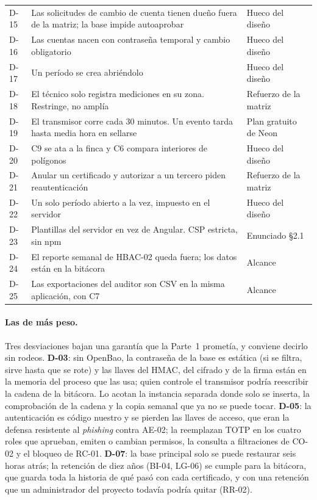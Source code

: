 \documentclass[11pt,a4paper]{article}
\theoremstyle{definition}
\theoremstyle{remark}
\begin{document}
{\begin{xltabular}{\linewidth}{@{}P{0.9cm}YP{2.4cm}@{}}
D-15 & Las solicitudes de cambio de cuenta tienen due\~no fuera de la matriz; la base impide autoaprobar & Hueco del dise\~no\\
D-16 & Las cuentas nacen con contrase\~na temporal y cambio obligatorio & Hueco del dise\~no\\
D-17 & Un per\'iodo se crea abri\'endolo & Hueco del dise\~no\\
D-18 & El t\'ecnico solo registra mediciones en su zona. Restringe, no ampl\'ia & Refuerzo de la matriz\\
D-19 & El transmisor corre cada 30 minutos. Un evento tarda hasta media hora en sellarse & Plan gratuito de Neon\\
D-20 & C9 se ata a la finca y C6 compara interiores de pol\'igonos & Hueco del dise\~no\\
D-21 & Anular un certificado y autorizar a un tercero piden reautenticaci\'on & Refuerzo de la matriz\\
D-22 & Un solo per\'iodo abierto a la vez, impuesto en el servidor & Hueco del dise\~no\\
D-23 & Plantillas del servidor en vez de Angular. CSP estricta, sin npm & Enunciado \S2.1\\
D-24 & El reporte semanal de HBAC-02 queda fuera; los datos est\'an en la bit\'acora & Alcance\\
D-25 & Las exportaciones del auditor son CSV en la misma aplicaci\'on, con C7 & Alcance\\
\end{xltabular}
}

\paragraph{Las de m\'as peso.} Tres desviaciones bajan una garant\'ia que la
Parte~1 promet\'ia, y conviene decirlo sin rodeos. \textbf{D-03}: sin OpenBao,
la contrase\~na de la base es est\'atica (si se filtra, sirve hasta que se
rote) y las llaves del HMAC, del cifrado y de la firma est\'an en la memoria del
proceso que las usa; quien controle el transmisor podr\'ia reescribir la cadena
de la bit\'acora. Lo acotan la instancia separada donde solo se inserta, la
comprobaci\'on de la cadena y la copia semanal que ya no se puede tocar.
\textbf{D-05}: la autenticaci\'on es c\'odigo nuestro y se pierden las llaves
de acceso, que eran la defensa resistente al \emph{phishing} contra AE-02; la
reemplazan TOTP en los cuatro roles que aprueban, emiten o cambian permisos,
la consulta a filtraciones de CO-02 y el bloqueo de RC-01. \textbf{D-07}: la
base principal solo se puede restaurar seis horas atr\'as; la retenci\'on de
diez a\~nos (BI-04, LG-06) se cumple para la bit\'acora, que guarda toda la
historia de qu\'e pas\'o con cada certificado, y con una retenci\'on que un
administrador del proyecto todav\'ia podr\'ia quitar (RR-02).
\end{document}
